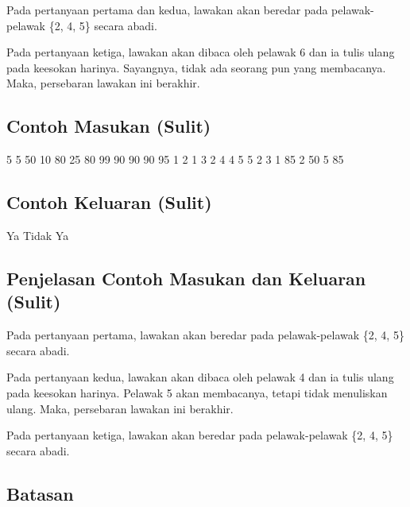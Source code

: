 \documentclass[../main_problemset.tex]{subfiles} %
\begin{document}
Pada pertanyaan pertama dan kedua, lawakan akan beredar pada pelawak-pelawak \{2, 4, 5\} secara abadi.

Pada pertanyaan ketiga, lawakan akan dibaca oleh pelawak 6 dan ia tulis ulang pada keesokan harinya. Sayangnya, tidak ada seorang pun yang membacanya. Maka, persebaran lawakan ini berakhir.

\vspace{.4cm}

\begin{minipage}[t]{0.5\textwidth}
\subsection*{Contoh Masukan (Sulit)}

\begin{lcverbatim}
5 5
50 10 80 25 80
99 90 90 90 95
1 2
1 3
2 4
4 5
5 2
3
1 85
2 50
5 85
\end{lcverbatim}
\end{minipage}
\begin{minipage}[t]{0.5\textwidth}
\subsection*{Contoh Keluaran (Sulit)}

\begin{lcverbatim}
Ya
Tidak
Ya
\end{lcverbatim}
\end{minipage}

\subsection*{Penjelasan Contoh Masukan dan Keluaran (Sulit)}

Pada pertanyaan pertama, lawakan akan beredar pada pelawak-pelawak \{2, 4, 5\} secara abadi.

Pada pertanyaan kedua, lawakan akan dibaca oleh pelawak 4 dan ia tulis ulang pada keesokan harinya. Pelawak 5 akan membacanya, tetapi tidak menuliskan ulang. Maka, persebaran lawakan ini berakhir.

Pada pertanyaan ketiga, lawakan akan beredar pada pelawak-pelawak \{2, 4, 5\} secara abadi.

\subsection*{Batasan}
\end{document}
